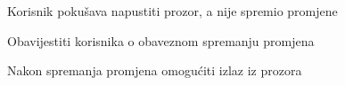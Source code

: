 \begin{packed_item}
\begin{packed_item}
							\item[4.a] Korisnik pokušava napustiti prozor, a nije spremio promjene 
							\item[] \begin{packed_enum}
								
								\item Obavijestiti korisnika o obaveznom spremanju promjena
								\item Nakon spremanja promjena omogućiti izlaz iz prozora
								
							\end{packed_enum}
							
						\end{packed_item}
						
					\end{packed_item}
					
					

